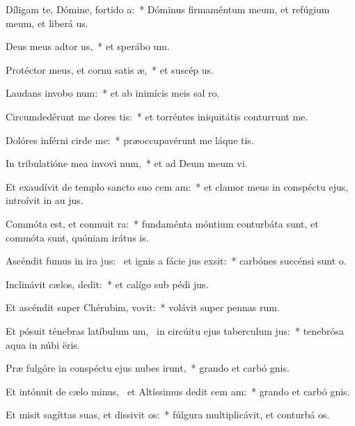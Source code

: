 \item Díligam te, Dómine, fortido a:~* Dóminus firmaméntum meum, et refúgium meum, et liberá us.
\item Deus meus adtor us,~* et sperábo  um.
\item Protéctor meus, et cornu satis æ,~* et suscép us.
\item Laudans invobo num:~* et ab inimícis meis sal ro.
\item Circumdedérunt me dores tis:~* et torréntes iniquitátis conturrunt me.
\item Dolóres inférni cirde me:~* præoccupavérunt me láque tis.
\item In tribulatióne mea invovi num,~* et ad Deum meum vi.
\item Et exaudívit de templo sancto suo cem am:~* et clamor meus in conspéctu ejus, introívit in au jus.
\item Commóta est, et conmuit ra:~* fundaménta móntium conturbáta sunt, et commóta sunt, quóniam irátus  is.
\item Ascéndit fumus in ira jus:~\pscross{} et ignis a fácie jus exsit:~* carbónes succénsi sunt  o.
\item Inclinávit cælos,  dedit:~* et calígo sub pédi jus.
\item Et ascéndit super Chérubim,  vovit:~* volávit super pennas rum.
\item Et pósuit ténebras latíbulum um,~\pscross{} in circúitu ejus taberculum jus:~* tenebrósa aqua in núbi ëris.
\item Præ fulgóre in conspéctu ejus nubes irunt,~* grando et carbó gnis.
\item Et intónuit de cælo minus,~\pscross{} et Altíssimus dedit cem am:~* grando et carbó gnis.
\item Et misit sagíttas suas, et dissivit os:~* fúlgura multiplicávit, et conturbá os.
